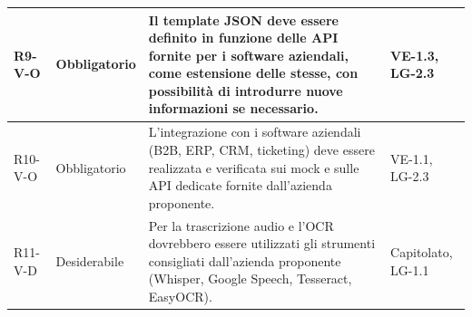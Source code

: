 {\begin{longtable}{|>{\raggedright\arraybackslash}p{1.8cm}|>{\raggedright\arraybackslash}p{2.3cm}|>{\raggedright\arraybackslash}p{6.6cm}|>{\raggedright\arraybackslash}p{3.1cm}|}
    \mbox{R9-V-O} & Obbligatorio & Il template JSON deve essere definito in funzione delle API fornite per i software aziendali, come estensione delle stesse, con possibilità di introdurre nuove informazioni se necessario. & \mbox{VE-1.3}, \mbox{LG-2.3} \\ \hline
    \mbox{R10-V-O} & Obbligatorio & L'integrazione con i software aziendali (B2B, ERP, CRM, ticketing) deve essere realizzata e verificata sui mock e sulle API dedicate fornite dall'azienda proponente. & \mbox{VE-1.1}, \mbox{LG-2.3} \\ \hline
    \mbox{R11-V-D} & Desiderabile & Per la trascrizione audio e l'OCR dovrebbero essere utilizzati gli strumenti consigliati dall'azienda proponente (Whisper, Google Speech, Tesseract, EasyOCR). & \mbox{Capitolato}, \mbox{LG-1.1} \\ \hline
    \end{longtable}
}